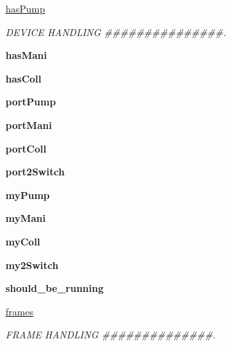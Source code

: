 \begin{DoxyCompactItemize}
\mbox{\hyperlink{class_g_u_i_1_1_app_a832d67cf56c0141ffd56e54385b82e7b}{has\+Pump}}
\begin{DoxyCompactList}\small\item\em D\+E\+V\+I\+CE H\+A\+N\+D\+L\+I\+NG \#\#\#\#\#\#\#\#\#\#\#\#\#\#\#. \end{DoxyCompactList}\item 
\mbox{\label{class_g_u_i_1_1_app_aa7b40b4ebea9441229d01ae291f2c8b9}} 
{\bfseries has\+Mani}
\item 
\mbox{\label{class_g_u_i_1_1_app_a3b2d0ff4d9fc08a19432790681276356}} 
{\bfseries has\+Coll}
\item 
\mbox{\label{class_g_u_i_1_1_app_abd4aa2117a4eba475b8cfffb3f107f06}} 
{\bfseries port\+Pump}
\item 
\mbox{\label{class_g_u_i_1_1_app_a2710624fcc68fcd5dad0b358fafec7b6}} 
{\bfseries port\+Mani}
\item 
\mbox{\label{class_g_u_i_1_1_app_aa87531923c2b8e9e720234f4720c7232}} 
{\bfseries port\+Coll}
\item 
\mbox{\label{class_g_u_i_1_1_app_abe63872b7a9cf8c94c4464a982cc3c50}} 
{\bfseries port2\+Switch}
\item 
\mbox{\label{class_g_u_i_1_1_app_a3727c32496fd20240638583ece4950b2}} 
{\bfseries my\+Pump}
\item 
\mbox{\label{class_g_u_i_1_1_app_a80a689f6903706036b501f15d692fdea}} 
{\bfseries my\+Mani}
\item 
\mbox{\label{class_g_u_i_1_1_app_a7f98c20fa1724e98c57e3a9b33cf4d06}} 
{\bfseries my\+Coll}
\item 
\mbox{\label{class_g_u_i_1_1_app_a7e5283000d01a86a8ae079ec390528cd}} 
{\bfseries my2\+Switch}
\item 
\mbox{\label{class_g_u_i_1_1_app_a58cdd38768a4e442d47fc18c9926e5db}} 
{\bfseries should\+\_\+be\+\_\+running}
\item 
\mbox{\label{class_g_u_i_1_1_app_a20a736d09e838e4c083949e67d001ab0}} 
\mbox{\hyperlink{class_g_u_i_1_1_app_a20a736d09e838e4c083949e67d001ab0}{frames}}
\begin{DoxyCompactList}\small\item\em F\+R\+A\+ME H\+A\+N\+D\+L\+I\+NG \#\#\#\#\#\#\#\#\#\#\#\#\#\#. \end{DoxyCompactList}\end{DoxyCompactItemize}


